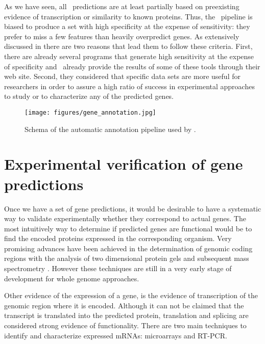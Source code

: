 As we have seen, all \ensembl\ predictions are at least partially
based on preexisting evidence of transcription or similarity to known
proteins. Thus, the \ensembl\ pipeline is biased to produce a set with
high specificity at the expense of sensitivity: they prefer to miss a
few features than heavily overpredict genes. As extensively discussed
in \cite{birney:2004a} there are two reasons that lead them to follow
these criteria. First, there are already several programs that
generate high sensitivity at the expense of specificity and \ensembl\
already provide the results of some of these tools through their web
site. Second, they considered that specific data sets are more useful
for researchers in order to assure a high ratio of success in
experimental approaches to study or to characterize any of the
predicted genes.

\begin{figure}
\begin{center}
\texttt{[image: figures/gene\_annotation.jpg]}
\caption{Schema of the automatic annotation pipeline used by \ensembl.}
\label{ensembl}
\end{center}
\end{figure}

\section{Experimental verification of gene predictions}

Once we have a set of gene predictions, it would be desirable to have
a systematic way to validate experimentally whether they correspond to
actual genes. The most intuitively way to determine if predicted genes
are functional would be to find the encoded proteins expressed in the
corresponding organism. Very promising advances have been achieved in
the determination of genomic coding regions with the analysis of two
dimensional protein gels and subsequent mass spectrometry
\citep{arthur:2004a}.  However these techniques are still in a very
early stage of development for whole genome approaches.

Other evidence of the expression of a gene, is the evidence of
transcription of the genomic region where it is encoded. Although it
can not be claimed that the transcript is translated into the
predicted protein, translation and splicing are considered strong
evidence of functionality. There are two main techniques to identify
and characterize expressed mRNAs: microarrays and RT-PCR.

